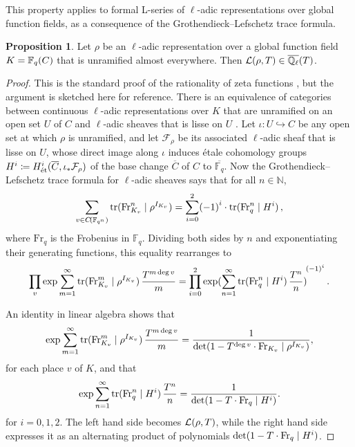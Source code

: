 \documentclass{article}
\theoremstyle{definition}
\newtheorem{proposition}[n]{Proposition}
\theoremstyle{definition}
\newcommand{\et}{\text{\'et}}
\newcommand{\FF}{\mathbb{F}}
\newcommand{\FFF}{\mathcal{F}}
\newcommand{\Fr}{\mathrm{Fr}}
\newcommand{\LLL}{\mathcal{L}}
\newcommand{\NN}{\mathbb{N}}
\newcommand{\QQ}{\mathbb{Q}}
\newcommand{\st}{\mid}
\newcommand{\tr}{\mathrm{tr}}
\newcommand{\br}{\!\del[0]}
\begin{document}
This property applies to formal L-series of $ \ell $-adic representations over global function fields, as a consequence of the Grothendieck--Lefschetz trace formula.

\begin{proposition}
\label{prop:rationality}
Let $ \rho $ be an $ \ell $-adic representation over a global function field $ K = \FF_q\br{C} $ that is unramified almost everywhere. Then $ \LLL\br{\rho, T} \in \overline{\QQ_\ell}\br{T} $.
\end{proposition}

\begin{proof}
This is the standard proof of the rationality of zeta functions \cite[Chapter VI, Theorem 13.4]{Mil80}, but the argument is sketched here for reference. There is an equivalence of categories between continuous $ \ell $-adic representations over $ K $ that are unramified on an open set $ U $ of $ C $ and $ \ell $-adic sheaves that is lisse on $ U $ \cite[Chapter V, Section 1]{Mil80}. Let $ \iota : U \hookrightarrow C $ be any open set at which $ \rho $ is unramified, and let $ \FFF_\rho $ be its associated $ \ell $-adic sheaf that is lisse on $ U $, whose direct image along $ \iota $ induces \'etale cohomology groups $ H^i \coloneqq H_\et^i\br{\overline{C}, \iota_*\FFF_\rho} $ of the base change $ \overline{C} $ of $ C $ to $ \overline{\FF_q} $. Now the Grothendieck--Lefschetz trace formula for $ \ell $-adic sheaves \cite[Chapter VI, Theorem 13.4]{Mil80} says that for all $ n \in \NN $,
$$ \sum_{v \in C\br{\FF_{q^n}}} \tr\br{\Fr_{K_v}^n \st \rho^{I_{K_v}}} = \sum_{i = 0}^2 \br{-1}^i \cdot \tr\br{\Fr_q^n \st H^i}, $$
where $ \Fr_q $ is the Frobenius in $ \FF_q $. Dividing both sides by $ n $ and exponentiating their generating functions, this equality rearranges to
$$ \prod_v \exp\sum_{m = 1}^\infty \tr\br{\Fr_{K_v}^m \st \rho^{I_{K_v}}}\dfrac{T^{m\deg v}}{m} = \prod_{i = 0}^2 \exp\br{\sum_{n = 1}^\infty \tr\br{\Fr_q^n \st H^i}\dfrac{T^n}{n}}^{\br{-1}^i}. $$

\pagebreak

\noindent An identity in linear algebra \cite[Chapter V, Lemma 2.7]{Mil80} shows that
$$ \exp\sum_{m = 1}^\infty \tr\br{\Fr_{K_v}^m \st \rho^{I_{K_v}}}\dfrac{T^{m\deg v}}{m} = \dfrac{1}{\det\br{1 - T^{\deg v} \cdot \Fr_{K_v} \st \rho^{I_{K_v}}}}, $$
for each place $ v $ of $ K $, and that
$$ \exp\sum_{n = 1}^\infty \tr\br{\Fr_q^n \st H^i}\dfrac{T^n}{n} = \dfrac{1}{\det\br{1 - T \cdot \Fr_q \st H^i}}. $$
for $ i = 0, 1, 2 $. The left hand side becomes $ \LLL\br{\rho, T} $, while the right hand side expresses it as an alternating product of polynomials $ \det\br{1 - T \cdot \Fr_q \st H^i} $.
\end{proof}
\end{document}
